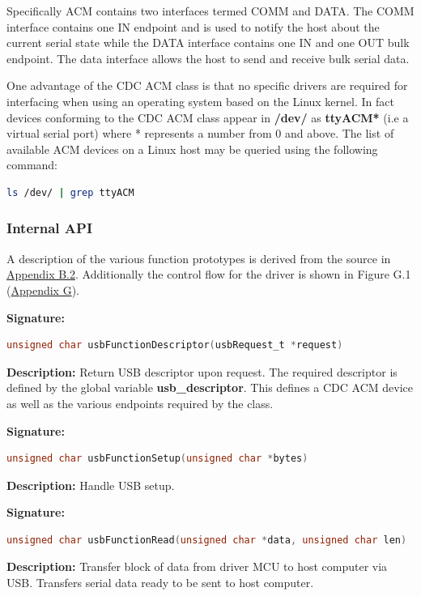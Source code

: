 Specifically ACM contains two interfaces termed COMM and DATA. The COMM interface contains one IN endpoint and is used to notify the host about the current serial state while the DATA interface contains one IN and one OUT bulk endpoint. The data interface allows the host to send and receive bulk serial data.

One advantage of the CDC ACM class is that no specific drivers are required for interfacing when using an operating system based on the Linux kernel. In fact devices conforming to the CDC ACM class appear in \textbf{/dev/} as \textbf{ttyACM*} (i.e a virtual serial port) where * represents a number from 0 and above. The list of available ACM devices on a Linux host may be queried using the following command:

\begin{lstlisting}[language=bash, frame=none]
ls /dev/ | grep ttyACM
\end{lstlisting}

\subsubsection{Internal API}

A description of the various function prototypes is derived from the source in \hyperref[sec:usbmcu]{Appendix B.2}. Additionally the control flow for the driver is shown in Figure G.1 (\hyperref[sec:usbflow]{Appendix G}).

\textbf{Signature: } 
\begin{lstlisting}[language=C]
unsigned char usbFunctionDescriptor(usbRequest_t *request)
\end{lstlisting}
\textbf{Description: }  \linebreak
Return USB descriptor upon request. The required descriptor is defined by the global variable \textbf{usb\_descriptor}. This defines a CDC ACM device as well as the various endpoints required by the class.

\textbf{Signature: } 
\begin{lstlisting}[language=C]
unsigned char usbFunctionSetup(unsigned char *bytes)
\end{lstlisting}
\textbf{Description: }  \linebreak
Handle USB setup.


\textbf{Signature: } 
\begin{lstlisting}[language=C]
unsigned char usbFunctionRead(unsigned char *data, unsigned char len)
\end{lstlisting}
\textbf{Description: }  \linebreak
Transfer block of data from driver MCU to host computer via USB. Transfers serial data ready to be sent to host computer.


